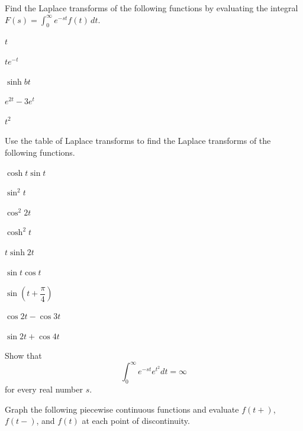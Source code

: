 \begin{exerciselist}
\item\label{exer:8.1.1}Find the Laplace transforms of the following functions by evaluating
the integral $F(s)=\int_0^\infty e^{-st} f(t)\,dt$.
\begin{alist*}[columns=3]
\item $t$
\item $te^{-t}$
\item $\sinh bt$
\item $e^{2t}-3e^t$
\item $t^2$
\end{alist*}

\item\label{exer:8.1.2}Use  the table of Laplace transforms to
find the Laplace transforms of the following functions.

\begin{alist*}[columns=3]
\item $\cosh t\sin t$
\item $\sin^2t$
\item $\cos^2 2t$
\item $\cosh^2 t$
\item $t\sinh 2t$
\item $\sin t\cos t$
\item $\sin\left(t+\dfrac{\pi}{4}\right)$
\item $\cos 2t -\cos 3t$
\item $\sin 2t +\cos 4t$
\end{alist*}

\item\label{exer:8.1.3}Show that
\[
\int_0^\infty e^{-st}e^{t^2} dt=\infty
\]
for every real number $s$.

\item\label{exer:8.1.4}Graph the following piecewise continuous functions and evaluate
$f(t+)$, $f(t-)$, and $f(t)$ at each point of discontinuity.


\end{exerciselist}
